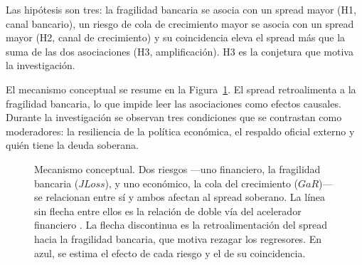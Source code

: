 Las hipótesis son tres: la fragilidad bancaria se asocia con un spread mayor (H1, canal bancario), un
riesgo de cola de crecimiento mayor se asocia con un spread mayor (H2, canal de crecimiento) y su
coincidencia eleva el spread más que la suma de las dos asociaciones (H3, amplificación). H3 es la
conjetura que motiva la investigación.

El mecanismo conceptual se resume en la Figura~\ref{fig:mecanismo}. El spread retroalimenta a la
fragilidad bancaria, lo que impide leer las asociaciones como efectos causales. Durante la
investigación se observan tres condiciones que se contrastan como moderadores: la resiliencia de la
política económica, el respaldo oficial externo y quién tiene la deuda soberana.

\begin{figure}[htbp]
\centering
{}
\caption[Mecanismo conceptual]{Mecanismo conceptual. Dos riesgos ---uno financiero, la fragilidad bancaria ($JLoss$), y uno económico, la cola del crecimiento ($GaR$)--- se relacionan entre sí y ambos afectan al spread soberano. La línea sin flecha entre ellos es la relación de doble vía del acelerador financiero \citep{BernankeGertlerGilchrist1996}. La flecha discontinua es la retroalimentación del spread hacia la fragilidad bancaria, que motiva rezagar los regresores. En azul, se estima el efecto de cada riesgo y el de su coincidencia.}
\label{fig:mecanismo}
\end{figure}

